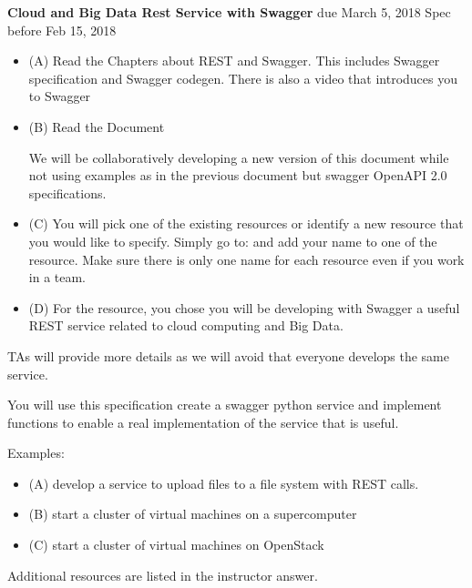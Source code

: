 \begin{exercise} {\bf Cloud and Big Data Rest Service with Swagger} due March 5, 2018 Spec before Feb 15, 2018

\begin{itemize}
     
   \item (A) Read the Chapters about REST and Swagger. This includes Swagger specification and Swagger codegen. There
         is also a video that introduces you to Swagger 
 
   \item (B) Read the Document 
 
We will be collaboratively developing a new version of this document while not using examples as in the previous
document but swagger OpenAPI 2.0 specifications.
 
   \item (C) You will pick one of the existing resources or identify a new resource that you would like to specify. Simply go to:
and add your name to one of the resource. Make sure there is only one name for each resource even if you work in a team.
 
   \item (D) For the resource, you chose you will be developing with Swagger a useful REST service related to cloud computing and Big Data.
 
 \end{itemize}
TAs will provide more details as we will avoid that everyone develops the same service. 
 
You will use this specification create a swagger python service and implement functions to enable a real implementation of the service that is useful.
 
Examples:

\begin{itemize}
\item (A) develop a service to upload files to a file system with REST calls.

\item (B) start a cluster of virtual machines on a supercomputer

\item (C) start a cluster of virtual machines on OpenStack

\end{itemize}


Additional resources are listed in the instructor answer. 
\end{exercise}




